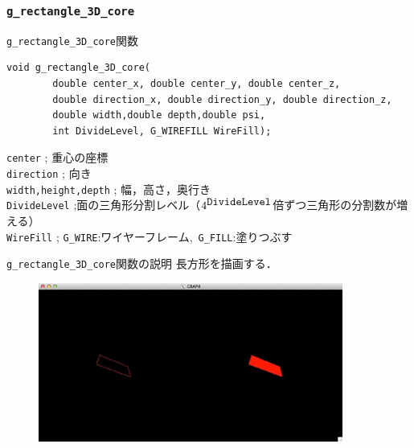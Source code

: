 \documentclass[a4paper,12pt]{jsarticle}%
\begin{document}
\subsubsection{\texttt{g\_rectangle\_3D\_core}}

\begin{itembox}[l]{\texttt{g\_rectangle\_3D\_core}関数}
\begin{verbatim}
void g_rectangle_3D_core(
        double center_x, double center_y, double center_z,
        double direction_x, double direction_y, double direction_z,
        double width,double depth,double psi,
        int DivideLevel, G_WIREFILL WireFill);
\end{verbatim}
\verb|center| ; 重心の座標\\
\verb|direction| ; 向き\\
\verb|width,height,depth| ; 幅，高さ，奥行き\\
\verb|DivideLevel| ;面の三角形分割レベル（$4^{\verb|DivideLevel|}$倍ずつ三角形の分割数が増える）\\
\verb|WireFill| ; \verb|G_WIRE|:ワイヤーフレーム,\ \verb|G_FILL|:塗りつぶす \\
\end{itembox}

\begin{itembox}[l]{\texttt{g\_rectangle\_3D\_core}関数の説明}
長方形を描画する．
\end{itembox}

\begin{figure}[htb]
	\includegraphics[width=100mm]{./Figures/eps/Canvas_g_rectangle.eps}
\end{figure}
\end{document}
